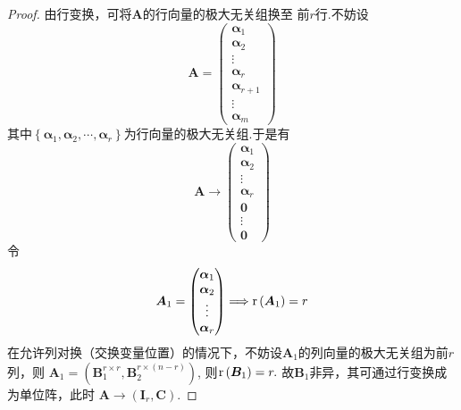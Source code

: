 {\begin{proof}
    由行变换，可将$\bm{A}$的行向量的极大无关组换至
    前$r$行.不妨设
    \[
        \bm{A}=\begin{pmatrix}
            \bm{\alpha}_1     \\
            \bm{\alpha}_2     \\
            \vdots            \\
            \bm{\alpha}_r     \\
            \bm{\alpha}_{r+1} \\
            \vdots            \\
            \bm{\alpha}_m
        \end{pmatrix}
    \]
    其中$\left\{\bm{\alpha}_1,
        \bm{\alpha}_2,
        \cdots,\bm{\alpha}_r\right\}$为行向量的极大无关组.于是有
    \[
        \bm{A}\longrightarrow
        \begin{pmatrix}
            \bm{\alpha}_1 \\
            \bm{\alpha}_2 \\
            \vdots        \\
            \bm{\alpha}_r \\
            \bm{0}        \\
            \vdots        \\
            \bm{0}
        \end{pmatrix}
    \]
    令\[
        \bm{A}_1=\begin{pmatrix}
            \bm{\alpha}_1 \\\bm{\alpha}_2\\\vdots\\\bm{\alpha}_r
        \end{pmatrix}\Longrightarrow
        \mathrm{r} \left(\bm{A}_1\right)=r
    \]
    在允许列对换（交换变量位置）的情况下，不妨设$\bm{A}_1$的列向量的极大无关组为前$r$列，则
    $\bm{A}_1=\left(\bm{B}_1^{r\times r}
        ,\bm{B}_2^{r\times \left(n-r\right)}\right)$,
    则$\mathrm{r} \left(\bm{B}_1\right)=r.$
    故$\bm{B}_1$非异，其可通过行变换成为单位阵，此时
    $\bm{A}\longrightarrow \left(\bm{I}_r,
        \bm{C}\right)$.


\end{proof}}
